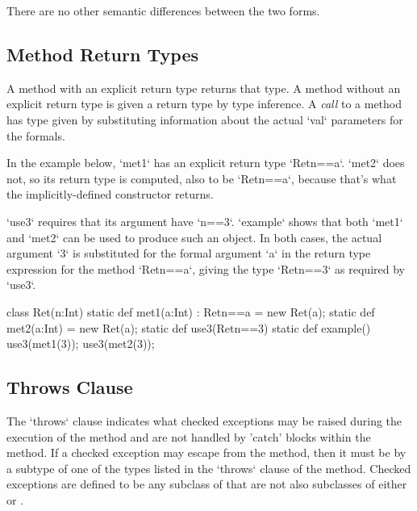 There are no other semantic differences between the two forms. 

\subsection{Method Return Types}

A method with an explicit return type returns that type.
A method without an
explicit return type is given a return type by type inference.
A {\em call} to a method has type given by substituting information about the
actual \xcd`val` parameters for the formals.

\begin{ex}

In the example below, \xcd`met1` has an explicit return type \xcd`Ret{n==a}`.
\xcd`met2` does not, so its return type is computed, also to be
\xcd`Ret{n==a}`, because that's what the implicitly-defined constructor 
returns.

\xcd`use3` requires that its argument have \xcd`n==3`.  
\xcd`example` shows that both \xcd`met1` and \xcd`met2` can be used to produce
such an object.  In both cases, the actual argument \xcd`3` is substituted for
the formal argument \xcd`a` in the return type expression for the method
\xcd`Ret{n==a}`, giving the type \xcd`Ret{n==3}` as required by \xcd`use3`.

\begin{xten}
class Ret(n:Int) {
  static def met1(a:Int) : Ret{n==a} = new Ret(a);
  static def met2(a:Int)             = new Ret(a);
  static def use3(Ret{n==3}) {}
  static def example() {
     use3(met1(3));
     use3(met2(3));
  }  
}
\end{xten}
%


\end{ex}


\subsection{Throws Clause}
The \xcd`throws` clause indicates what checked exceptions may be
raised during the execution of the method and are not handled by
\xcd'catch' blocks within the method.  If a checked exception may
escape from the method, then it must be by a subtype of one of the
types listed in the \xcd`throws` clause of the method.   Checked
exceptions are defined to be any subclass of
 that are not also subclasses of
either  or . 

